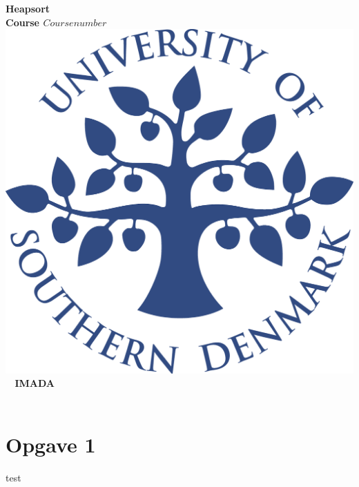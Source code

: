 \documentclass[a4paper,10pt,titlepage]{report}
\date{}
\begin{document}
\begin{titlepage}
\centering
    \vspace*{9\baselineskip}
    \huge
    \bfseries
    Heapsort \\

    \normalfont
	\huge
    Course \(Course number\)  \\ [4\baselineskip]
    \normalfont
	\includegraphics[scale=0.2]{SDU_logo}
    \vfill\
    \vspace{5mm}
    IMADA \\
    \vspace{5mm}
    \textbf{\datedate}  \bf{} \\[2\baselineskip]
\end{titlepage}

\renewcommand{\thepage}{\roman{page}}%
\tableofcontents

\newpage
\setcounter{page}{1}
\renewcommand{\thepage}{\arabic{page}}
\section{Opgave 1}

test
\end{document}
